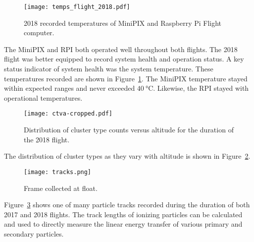 %
%
%
%

\begin{figure}[H]
\centering
\texttt{[image: temps\_flight\_2018.pdf]}
\caption{2018 recorded temperatures of MiniPIX and Raspberry Pi Flight computer.}
\label{fig:temps_2018}
\end{figure}
%
The MiniPIX and RPI both operated well throughout both flights.  The 2018 flight was better equipped to record system health and operation status.  A key status indicator of system health was the system temperature.  These temperatures recorded are shown in Figure~\ref{fig:temps_2018}.  The MiniPIX temperature stayed within expected ranges and never exceeded $\SI{40}{\degreeCelsius}$.  Likewise, the RPI stayed with operational temperatures.
%
%
%
\begin{figure}[H]
\centering
\texttt{[image: ctva-cropped.pdf]}
\caption{Distribution of cluster type counts versus altitude for the duration of the 2018 flight.}
\label{fig:cluster2018}
\end{figure}
The distribution of cluster types as they vary with altitude is shown in Figure~\ref{fig:cluster2018}.  
\begin{figure}[H]
\centering
\texttt{[image: tracks.png]}
\caption{Frame collected at float.}
\label{fig:frame1}
\end{figure}
Figure~\ref{fig:frame1} shows one of many particle tracks recorded during the duration of both 2017 and 2018 flights.  The track lengths of ionizing particles can be calculated and used to directly measure the linear energy transfer of various primary and secondary particles.


